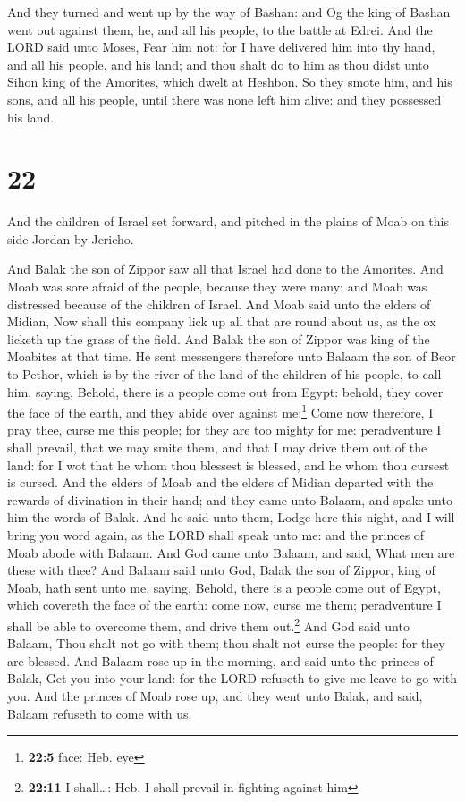  And they turned and went up by the way of Bashan: and Og
the king of Bashan went out against them, he, and all his people, to the
battle at Edrei.  And the LORD said unto Moses, Fear him
not: for I have delivered him into thy hand, and all his people, and his
land; and thou shalt do to him as thou didst unto Sihon king of the
Amorites, which dwelt at Heshbon.  So they smote him, and
his sons, and all his people, until there was none left him alive: and
they possessed his land.

\hypertarget{section-21}{%
\section{22}\label{section-21}}

 And the children of Israel set forward, and pitched in
the plains of Moab on this side Jordan by Jericho.

 And Balak the son of Zippor saw all that Israel had done
to the Amorites.  And Moab was sore afraid of the people,
because they were many: and Moab was distressed because of the children
of Israel.  And Moab said unto the elders of Midian, Now
shall this company lick up all that are round about us, as the ox
licketh up the grass of the field. And Balak the son of Zippor was king
of the Moabites at that time.  He sent messengers
therefore unto Balaam the son of Beor to Pethor, which is by the river
of the land of the children of his people, to call him, saying, Behold,
there is a people come out from Egypt: behold, they cover the face of
the earth, and they abide over against me:\footnote{\textbf{22:5} face:
  Heb. eye}  Come now therefore, I pray thee, curse me
this people; for they are too mighty for me: peradventure I shall
prevail, that we may smite them, and that I may drive them out of the
land: for I wot that he whom thou blessest is blessed, and he whom thou
cursest is cursed.  And the elders of Moab and the elders
of Midian departed with the rewards of divination in their hand; and
they came unto Balaam, and spake unto him the words of Balak.
 And he said unto them, Lodge here this night, and I will
bring you word again, as the LORD shall speak unto me: and the princes
of Moab abode with Balaam.  And God came unto Balaam, and
said, What men are these with thee?  And Balaam said unto
God, Balak the son of Zippor, king of Moab, hath sent unto me, saying,
 Behold, there is a people come out of Egypt, which
covereth the face of the earth: come now, curse me them; peradventure I
shall be able to overcome them, and drive them out.\footnote{\textbf{22:11}
  I shall\ldots: Heb. I shall prevail in fighting against him}
 And God said unto Balaam, Thou shalt not go with them;
thou shalt not curse the people: for they are blessed. 
And Balaam rose up in the morning, and said unto the princes of Balak,
Get you into your land: for the LORD refuseth to give me leave to go
with you.  And the princes of Moab rose up, and they went
unto Balak, and said, Balaam refuseth to come with us.

